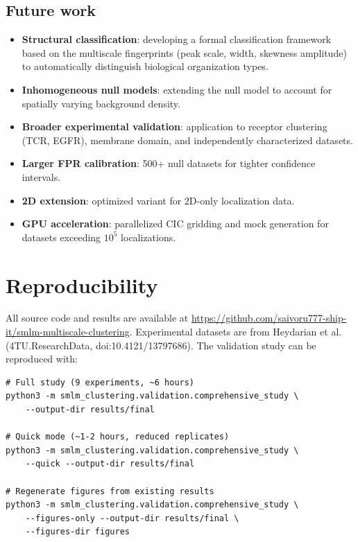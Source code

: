 \documentclass[11pt]{article}
\begin{document}
\subsection{Future work}

\begin{itemize}
  \item \textbf{Structural classification}: developing a formal
    classification framework based on the multiscale fingerprints
    (peak scale, width, skewness amplitude) to automatically
    distinguish biological organization types.
  \item \textbf{Inhomogeneous null models}: extending the null model to
    account for spatially varying background density.
  \item \textbf{Broader experimental validation}: application to
    receptor clustering (TCR, EGFR), membrane domain, and
    independently characterized datasets.
  \item \textbf{Larger FPR calibration}: 500+ null datasets for tighter
    confidence intervals.
  \item \textbf{2D extension}: optimized variant for 2D-only
    localization data.
  \item \textbf{GPU acceleration}: parallelized CIC gridding and
    mock generation for datasets exceeding $10^5$ localizations.
\end{itemize}

\section{Reproducibility}

All source code and results are available at
\url{https://github.com/saivoru777-ship-it/smlm-multiscale-clustering}.
Experimental datasets are from Heydarian et al.\ \citep{heydarian2021}
(4TU.ResearchData, doi:10.4121/13797686). The validation study can be
reproduced with:

\begin{verbatim}
# Full study (9 experiments, ~6 hours)
python3 -m smlm_clustering.validation.comprehensive_study \
    --output-dir results/final

# Quick mode (~1-2 hours, reduced replicates)
python3 -m smlm_clustering.validation.comprehensive_study \
    --quick --output-dir results/final

# Regenerate figures from existing results
python3 -m smlm_clustering.validation.comprehensive_study \
    --figures-only --output-dir results/final \
    --figures-dir figures
\end{verbatim}
\end{document}
